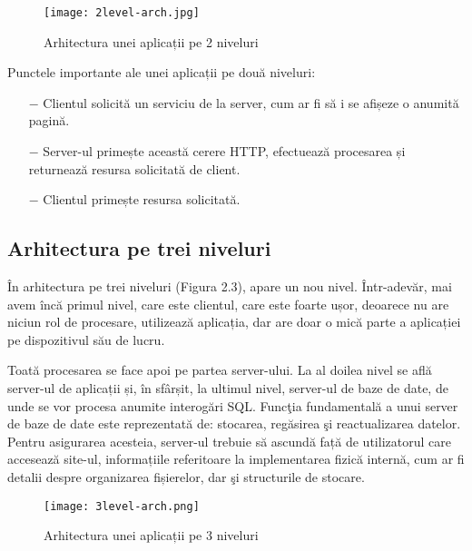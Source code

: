 \begin{figure}[H]
	\begin{center}
		\texttt{[image: 2level-arch.jpg]}
		\caption{Arhitectura unei aplicații pe 2 niveluri}
	\end{center}
\end{figure}



Punctele importante ale unei aplicații pe două niveluri:

\begin{itemize}
	\addtolength{\itemindent}{1cm}
	\item[$-$]Clientul solicită un serviciu de la server, cum ar fi să i se afișeze o anumită pagină.
	\item[$-$]Server-ul primește această cerere HTTP, efectuează procesarea și returnează resursa solicitată de client.
	\item[$-$]Clientul primește resursa solicitată.
	\newline
\end{itemize}


\subsection{Arhitectura pe trei niveluri}
În arhitectura pe trei niveluri (Figura 2.3), apare un nou nivel. Într-adevăr, mai avem încă primul nivel, care este clientul, care este foarte ușor, deoarece nu are niciun rol de procesare, utilizează aplicația, dar are doar o mică parte a aplicației pe dispozitivul său de lucru.\newline

Toată procesarea se face apoi pe partea server-ului. La al doilea nivel se află server-ul de aplicații și, în sfârșit, la ultimul nivel, server-ul de baze de date, de unde se vor procesa anumite interogări SQL. Funcţia fundamentală a unui server de baze de date este reprezentată de: stocarea, regăsirea şi reactualizarea datelor. Pentru asigurarea acesteia, server-ul trebuie să ascundă față de utilizatorul care accesează site-ul, informațiile referitoare la implementarea fizică internă, cum ar fi detalii despre organizarea fișierelor, dar şi structurile de stocare.

\begin{figure}[H]
	\begin{center}
		\texttt{[image: 3level-arch.png]}
		\caption{Arhitectura unei aplicații pe 3 niveluri}
	\end{center}
\end{figure}

